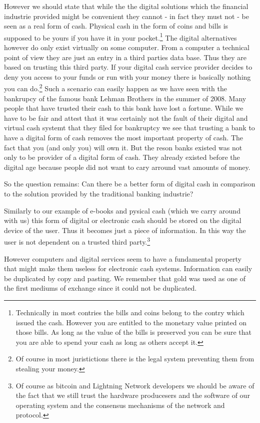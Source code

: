 \documentclass[ebook,12pt,oneside,openany]{memoir}
\begin{document}
However we should state that while the the digital solutions which the financial industrie provided might be convenient they cannot - in fact they must not - be seen as a real form of cash.
Physical cash in the form of coins and bills is supposed to be yours if you have it in your pocket.\footnote{Technically in most contries the bills and coins belong to the contry which issued the cash. However you are entitled to the monetary value printed on those bills. As long as the value of the bills is preserved you can be sure that you are able to spend your cash as long as others accept it.}
The digital alternatives however do only exist virtually on some computer.
From a computer a technical point of view they are just an entry in a third parties data base.
Thus they are based on trusting this third party.
If your digital cash service provider decides to deny you access to your funds or run with your money there is basically nothing you can do.\footnote{Of course in most juristictions there is the legal system preventing them from stealing your money.}
Such a scenario can easily happen as we have seen with the bankrupcy of the famous bank Lehman Brothers in the summer of 2008. Many people that have trusted their cash to this bank have lost a fortune.
While we have to be fair and attest that it was certainly not the fault of their digital and virtual cash systemt that they filed for bankruptcy we see that trusting a bank to have a digital form of cash removes the most important property of cash.
The fact that you (and only you) will own it.
But the reson banks existed was not only to be provider of a digital form of cash.
They already existed before the digital age because people did not want to cary arround vast amounts of money.

So the question remains: Can there be a better form of digital cash in comparison to the solution provided by the traditional banking industrie? 

Similarly to our example of e-books and pysical cash (which we carry around with us) this form of digital or electronic cash should be stored on the digital device of the user.
Thus it becomes just a piece of information.
In this way the user is not dependent on a trusted third party.\footnote{Of course as bitcoin and Lightning Network developers we should be aware of the fact that we still trust the hardware producesers and the software of our operating system and the consensus mechanisms of the network and protocol.}

However computers and digital services seem to have a fundamental property that might make them useless for electronic cash systems.
Information can easily be duplicated by copy and pasting.
We remember that gold was used as one of the first mediums of exchange since it could not be duplicated.
\end{document}
